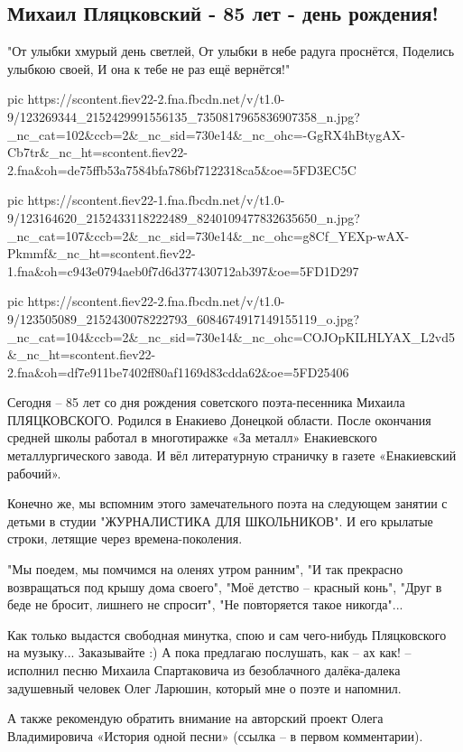  
 
 

\subsection{Михаил Пляцковский - 85 лет - день рождения!}
\label{sec:02_11_2020.fb.roman_barashev.1.dr_mihail_pljackovskii_85}

\obeycr
"От улыбки хмурый день светлей,
От улыбки в небе радуга проснётся,
Поделись улыбкою своей,
И она к тебе не раз ещё вернётся!"
\restorecr

\ifcmt
pic https://scontent.fiev22-2.fna.fbcdn.net/v/t1.0-9/123269344_2152429991556135_7350817965836907358_n.jpg?_nc_cat=102&ccb=2&_nc_sid=730e14&_nc_ohc=-GgRX4hBtygAX-Cb7tr&_nc_ht=scontent.fiev22-2.fna&oh=de75ffb53a7584bfa786bf7122318ca5&oe=5FD3EC5C

pic https://scontent.fiev22-1.fna.fbcdn.net/v/t1.0-9/123164620_2152433118222489_8240109477832635650_n.jpg?_nc_cat=107&ccb=2&_nc_sid=730e14&_nc_ohc=g8Cf_YEXp-wAX-Pkmmf&_nc_ht=scontent.fiev22-1.fna&oh=c943e0794aeb0f7d6d377430712ab397&oe=5FD1D297

pic https://scontent.fiev22-2.fna.fbcdn.net/v/t1.0-9/123505089_2152430078222793_6084674917149155119_o.jpg?_nc_cat=104&ccb=2&_nc_sid=730e14&_nc_ohc=COJOpKILHLYAX_L2vd5&_nc_ht=scontent.fiev22-2.fna&oh=df7e911be7402ff80af1169d83cdda62&oe=5FD25406
\fi

Сегодня -- 85 лет со дня рождения советского поэта-песенника  Михаила
ПЛЯЦКОВСКОГО. Родился в Енакиево Донецкой области. После окончания средней
школы работал в многотиражке «За металл» Енакиевского металлургического завода.
И вёл литературную страничку в газете «Енакиевский рабочий».

Конечно же, мы вспомним этого замечательного поэта на следующем занятии с
детьми в студии "ЖУРНАЛИСТИКА ДЛЯ ШКОЛЬНИКОВ". И его крылатые строки, летящие
через времена-поколения.

"Мы поедем, мы помчимся на оленях утром ранним", "И так прекрасно возвращаться
под крышу дома своего", "Моё детство -- красный конь", "Друг в беде не бросит,
лишнего не спросит", "Не повторяется такое никогда"...

Как только выдастся свободная минутка, спою и сам чего-нибудь Пляцковского на
музыку... Заказывайте :) А пока предлагаю послушать, как -- ах как! -- исполнил
песню Михаила Спартаковича из безоблачного далёка-далека задушевный человек
Олег Ларюшин, который мне о поэте и напомнил. 

А также рекомендую обратить внимание на авторский проект Олега Владимировича
«История одной песни» (ссылка -- в первом комментарии).
